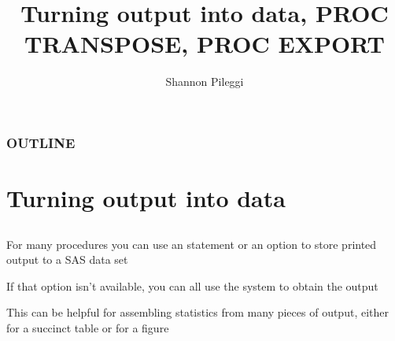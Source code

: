 



\title[Lecture 12]{Turning output into data, PROC TRANSPOSE, PROC EXPORT}
\author[Pileggi]{Shannon Pileggi}


\date{}




\begin{frame}
\titlepage
\end{frame}

\begin{frame}
\frametitle{OUTLINE\qquad\qquad\qquad} \tableofcontents[hideallsubsections]
\end{frame}



\section[Turning output into data]{Turning output into data}
\subsection{}
\begin{frame}
\end{frame}

\begin{frame}
\bi
\item For many procedures you can use an  statement or an  option to store printed output to a SAS data set
\item If that option isn't available, you can all use the  system to obtain the output
\item This can be helpful for assembling statistics from many pieces of output, either for a succinct table or for a figure
\ei
\end{frame}

